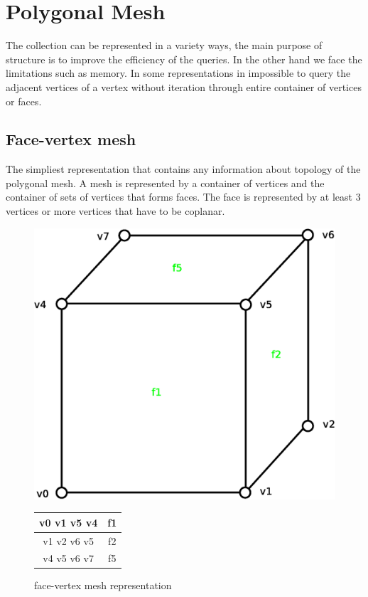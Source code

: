 \section{Polygonal Mesh}

The collection can be represented in a variety ways, the main purpose of structure is to improve
the efficiency of the queries. In the other hand we face the limitations such as memory. In some
representations in impossible to query the adjacent vertices of a vertex without iteration through
entire container of vertices or faces.

\subsection{Face-vertex mesh}
\label{sec:face-vertex}

The simpliest representation that contains any information about topology of the polygonal
mesh. A mesh is represented by a container of vertices and the container of sets of vertices that
forms faces. The face is represented by at least 3 vertices or more vertices that have to be
coplanar.\\

\begin{figure}[h]

\begin{minipage}[hb]{0.65\linewidth}
\centering
\includegraphics[width=0.6\linewidth]{../img/fv_rep_mesh.eps}
\label{fig:figure1}
\end{minipage}
\hspace{0.5cm}
\begin{minipage}[hb]{0.25\linewidth}
\centering
\begin{tabular}{|c|c|}
\hline
\textsf{v0 v1 v5 v4} & \textsf{f1}\\
\hline
\textsf{v1 v2 v6 v5} & \textsf{f2}\\
\hline
\textsf{v4 v5 v6 v7} & \textsf{f5}\\
\hline
\end{tabular}
\label{fig:fv_mesh}
\end{minipage}

\caption{face-vertex mesh representation}
\end{figure}

